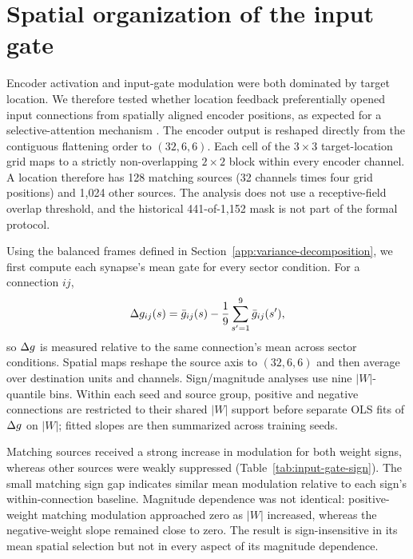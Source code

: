 \section{Spatial organization of the input gate}
\label{app:input-gate}

Encoder activation and input-gate modulation were both dominated by target location. We therefore tested whether location feedback preferentially opened input connections from spatially aligned encoder positions, as expected for a selective-attention mechanism \citep{desimone1995neural}. The encoder output is reshaped directly from the contiguous flattening order to \((32,6,6)\). Each cell of the \(3\times3\) target-location grid maps to a strictly non-overlapping \(2\times2\) block within every encoder channel. A location therefore has 128 matching sources (32 channels times four grid positions) and 1,024 other sources. The analysis does not use a receptive-field overlap threshold, and the historical 441-of-1,152 mask is not part of the formal protocol.

Using the balanced frames defined in Section~\ref{app:variance-decomposition}, we first compute each synapse's mean gate for every sector condition. For a connection \(ij\),
\[
\Delta g_{ij}(s)=\bar g_{ij}(s)-\frac{1}{9}\sum_{s'=1}^{9}\bar g_{ij}(s'),
\]
so \(\Delta g\) is measured relative to the same connection's mean across sector conditions. Spatial maps reshape the source axis to \((32,6,6)\) and then average over destination units and channels. Sign/magnitude analyses use nine \(|W|\)-quantile bins. Within each seed and source group, positive and negative connections are restricted to their shared \(|W|\) support before separate OLS fits of \(\Delta g\) on \(|W|\); fitted slopes are then summarized across training seeds.

Matching sources received a strong increase in modulation for both weight signs, whereas other sources were weakly suppressed (Table~\ref{tab:input-gate-sign}). The small matching sign gap indicates similar mean modulation relative to each sign's within-connection baseline. Magnitude dependence was not identical: positive-weight matching modulation approached zero as \(|W|\) increased, whereas the negative-weight slope remained close to zero. The result is sign-insensitive in its mean spatial selection but not in every aspect of its magnitude dependence.

